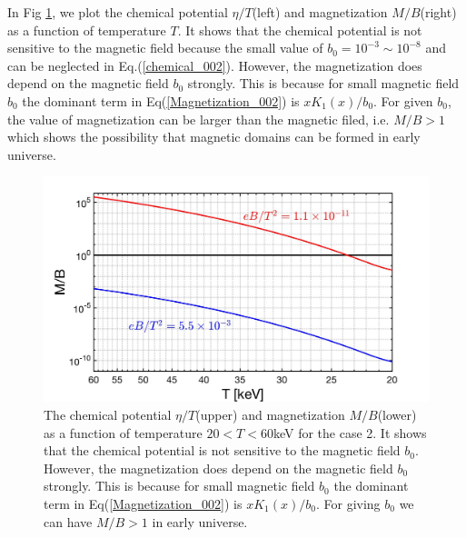 \documentclass[Universe,article,submit,moreauthors,pdftex]{Definitions/mdpi}
\begin{document}
\begin{itemize}
In Fig {\ref{Case2_fig}}, we plot the chemical potential $\eta/T$(left) and magnetization $M/B$(right) as a function of temperature $T$. It shows that the chemical potential is not sensitive to the magnetic field because the small value of $b_0=10^{-3}\sim10^{-8}$ and can be neglected in Eq.(\ref{chemical_002}). However, the magnetization does depend on the magnetic field $b_0$ strongly. This is because for small magnetic field $b_0$ the dominant term in Eq(\ref{Magnetization_002}) is $xK_1(x)/b_0$. For given $b_0$, the value of magnetization can be larger than the magnetic filed, i.e. $M/B>1$  which shows the possibility that magnetic domains can be formed in early universe.

\begin{figure}[h]
\centering
\includegraphics[width=0.75\linewidth]{Magnetization_case2.jpg}
\caption{The chemical potential $\eta/T$(upper) and magnetization $M/B$(lower) as a function of temperature $20<T<60$keV  for the case 2.  It shows that the chemical potential is not sensitive to the magnetic field $b_0$. However, the magnetization does depend on the magnetic field $b_0$ strongly. This is because for small magnetic field $b_0$ the dominant term in Eq(\ref{Magnetization_002}) is $xK_1(x)/b_0$. For giving $b_0$  we can have $M/B>1$ in early universe.}
\label{Case2_fig} 
\end{figure}

\end{itemize}

\end{document}
